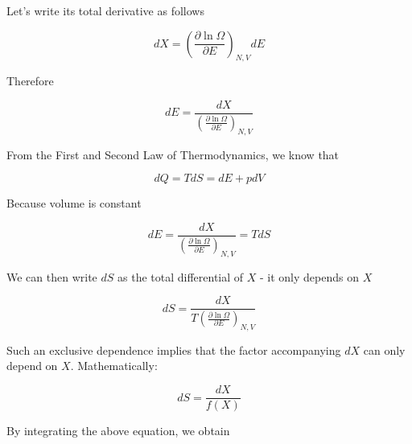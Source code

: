 \documentclass[12pt,a4paper]{report}
\newcommand{\esp}{\vspace{0.5cm}}
\begin{document}
	\esp
	
	\noindent Let's write its total derivative as follows
	
	\esp
	
	\begin{equation}
		dX = \left( \frac{\partial \ln \Omega}{\partial E} \right)_{N,V} dE \tag{4.40}
	\end{equation}
	
	\esp
	
	\noindent Therefore
	
	\esp
	
	\begin{equation}
		dE = \frac{dX}{\left( \frac{\partial \ln \Omega}{\partial E} \right)_{N,V}} \tag{4.41}
	\end{equation}
	
	\esp
	
	\noindent From the First and Second Law of Thermodynamics, we know that
	
	\esp
	
	\begin{equation}
		dQ = T dS = dE + p dV
	\end{equation}
	
	\esp
	
	\noindent Because volume is constant
	
	\esp
	
	\begin{equation}
		dE = \frac{dX}{\left( \frac{\partial \ln \Omega}{\partial E} \right)_{N,V}} = T dS
	\end{equation}
	
	\esp
	
	\noindent We can then write $dS$ as the total differential of $X$ - it only depends on $X$
	
	\esp
	
	\begin{equation}
		dS = \frac{dX}{T \left( \frac{\partial \ln \Omega}{\partial E} \right)_{N,V}}
	\end{equation}
	
	\esp
	
	\noindent Such an exclusive dependence implies that the factor accompanying $dX$ can only depend on $X$. Mathematically:
	
	\esp
	
	\begin{equation}
		dS = \frac{dX}{f(X)}
	\end{equation}
	
	\esp
	
	\noindent By integrating the above equation, we obtain
	
\end{document}
